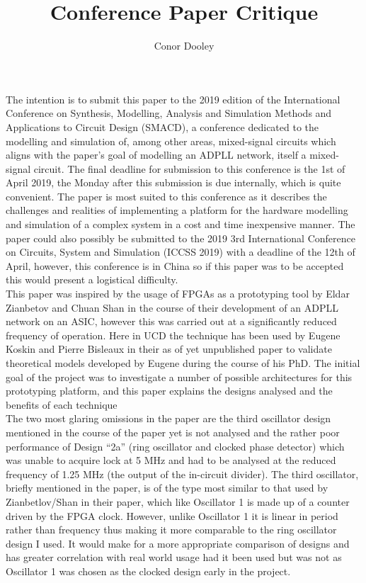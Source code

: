 \documentclass[a4paper,12pt]{article}
\title{Conference Paper Critique}
\author{Conor Dooley}
\begin{document}
\maketitle

The intention is to submit this paper to the 2019 edition of the International Conference on Synthesis, Modelling, Analysis and Simulation Methods and Applications to Circuit Design (SMACD), a conference dedicated to the modelling and simulation of, among other areas, mixed-signal circuits which aligns with the paper's goal of modelling an ADPLL network, itself a mixed-signal circuit. The final deadline for submission to this conference is the 1st of April 2019, the Monday after this submission is due internally, which is quite convenient. The paper is most suited to this conference as it describes the challenges and realities of implementing a platform for the hardware modelling and simulation of a complex system in a cost and time inexpensive manner. The paper could also possibly be submitted to the 2019 3rd International Conference on Circuits, System and Simulation (ICCSS 2019) with a deadline of the 12th of April, however, this conference is in China so if this paper was to be accepted this would present a logistical difficulty.\\

This paper was inspired by the usage of FPGAs as a prototyping tool by Eldar Zianbetov and Chuan Shan in the course of their development of an ADPLL network on an ASIC, however this was carried out at a significantly reduced frequency of operation. Here in UCD the technique has been used by Eugene Koskin and Pierre Bisleaux in their as of yet unpublished paper to validate theoretical models developed by Eugene during the course of his PhD. The initial goal of the project was to investigate a number of possible architectures for this prototyping platform, and this paper explains the designs analysed and the benefits of each technique \\

The two most glaring omissions in the paper are the third oscillator design mentioned in the course of the paper yet is not analysed and the rather poor performance of Design ``2a'' (ring oscillator and clocked phase detector) which was unable to acquire lock at 5 MHz and had to be analysed at the reduced frequency of 1.25 MHz (the output of the in-circuit divider). %
The third oscillator, briefly mentioned in the paper, is of the type most similar to that used by Zianbetlov/Shan in their paper, which like Oscillator 1 is made up of a counter driven by the FPGA clock. However, unlike Oscillator 1 it is linear in period rather than frequency thus making it more comparable to the ring oscillator design I used. It would make for a more appropriate comparison of designs and has greater correlation with real world usage had it been used but was not as Oscillator 1 was chosen as the clocked design early in the project.\\
\end{document}
